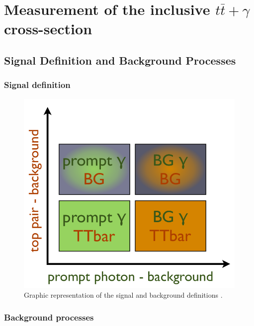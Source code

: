 \chapter{Measurement of the inclusive $t\bar{t}+\gamma$ cross-section}\label{chap-crosssection}

\section{Signal Definition and Background Processes}

\subsection{Signal definition}

\begin{figure} \label{fig-signalphotonplot}
\begin{center}
\includegraphics[scale=0.33]{Figures/SignalPhotonPlot.png}
\caption{Graphic representation of the signal and background definitions \cite{MishaSignalDefinition}.}
\end{center}
\end{figure}

\subsection{Background processes}

